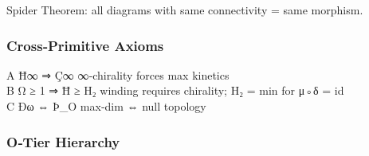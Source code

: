 \documentclass[12pt,a4paper]{article}
\begin{document}
Spider Theorem: all diagrams with same connectivity = same morphism.

\hypertarget{crossprimitive-axioms}{%
\subsubsection{Cross‑Primitive Axioms}\label{crossprimitive-axioms}}

A \textbar{} Ħ∞ ⇒ Ç∞ \textbar{} ∞‑chirality forces max kinetics
\textbar{}\\
B \textbar{} Ω ≥ 1 ⇒ Ħ ≥ H₂ \textbar{} winding requires chirality; H₂ =
min for μ◦δ = id \textbar{}\\
C \textbar{} Ðω ⇔ Þ\_O \textbar{} max‑dim ⇔ null topology \textbar{}

\hypertarget{otier-hierarchy}{%
\subsubsection{O‑Tier Hierarchy}\label{otier-hierarchy}}
\end{document}
